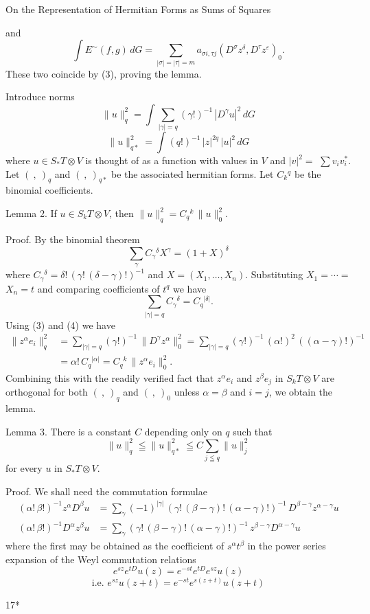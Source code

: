 On the Representation of Hermitian Forms as Sums of Squares 

and
\[ \int E^{\sim}(f,g)\,dG = \sum_{|\sigma|=|\tau|=m} a_{\sigma i,\tau j}(D^{\sigma} z^{\delta}, D^{\tau} z^{\varepsilon})_0 . \]
These two coincide by (3), proving the lemma.

Introduce norms
\[ \|u\|_q^2 = \int \sum_{|\gamma|=q} (\gamma!)^{-1}\, |D^{\gamma} u|^2\, dG \]
\[ \|u\|_{q*}^2 = \int (q!)^{-1}\, |z|^{2q}\, |u|^2\, dG \]
where $u \in S_* T \otimes V$ is thought of as a function with values in $V$ and $|v|^2 =$
$\sum v_i v_i^*$. Let $(\ ,\ )_q$ and $(\ ,\ )_{q*}$ be the associated hermitian forms. Let
$C_k{}^q$ be the binomial coefficients.

Lemma 2. If $u \in S_k T \otimes V$, then $\|u\|_q^2 = C_q{}^k\, \|u\|_0^2$.

Proof. By the binomial theorem
\[ \sum_{\gamma} C_{\gamma}{}^{\delta} X^{\gamma} = (1+X)^{\delta} \]
where $C_{\gamma}{}^{\delta} = \delta!\,(\gamma!\,(\delta-\gamma)!)^{-1}$ and $X=(X_1,\dots,X_n)$. Substituting $X_1 = \cdots =$
$X_n = t$ and comparing coefficients of $t^q$ we have
\[ \sum_{|\gamma|=q} C_{\gamma}{}^{\delta} = C_q{}^{|\delta|}. \tag{4} \]
Using (3) and (4) we have
\[ \begin{aligned} \|z^{\alpha} e_i\|_q^2 &= \sum_{|\gamma|=q} (\gamma!)^{-1}\, \|D^{\gamma} z^{\alpha}\|_0^2 = \sum_{|\gamma|=q} (\gamma!)^{-1}\, (\alpha!)^2\, ((\alpha-\gamma)!)^{-1} \\ &= \alpha!\, C_q{}^{|\alpha|} = C_q{}^k\, \|z^{\alpha} e_i\|_0^2 . \end{aligned} \]
Combining this with the readily verified fact that $z^{\alpha} e_i$ and $z^{\beta} e_j$ in $S_k T \otimes V$
are orthogonal for both $(\ ,\ )_q$ and $(\ ,\ )_0$ unless $\alpha=\beta$ and $i=j$, we obtain
the lemma.

Lemma 3. There is a constant $C$ depending only on $q$ such that
\[ \|u\|_q^2 \leqq \|u\|_{q*}^2 \leqq C \sum_{j \leqq q} \|u\|_j^2 \]
for every $u$ in $S_* T \otimes V$.

Proof. We shall need the commutation formulae
\[ \begin{aligned} (\alpha!\,\beta!)^{-1} z^{\alpha} D^{\beta} u &= \sum_{\gamma} (-1)^{|\gamma|}\, (\gamma!\,(\beta-\gamma)!\,(\alpha-\gamma)!)^{-1}\, D^{\beta-\gamma} z^{\alpha-\gamma} u \\ (\alpha!\,\beta!)^{-1} D^{\alpha} z^{\beta} u &= \sum_{\gamma} (\gamma!\,(\beta-\gamma)!\,(\alpha-\gamma)!)^{-1}\, z^{\beta-\gamma} D^{\alpha-\gamma} u \end{aligned} \tag{5} \]
where the first may be obtained as the coefficient of $s^{\alpha} t^{\beta}$ in the power
series expansion of the Weyl commutation relations
\[ e^{sz} e^{tD} u(z) = e^{-st} e^{tD} e^{sz} u(z) \]
\[ \text{i.e. } e^{sz} u(z+t) = e^{-st} e^{s(z+t)} u(z+t) \]

17*

